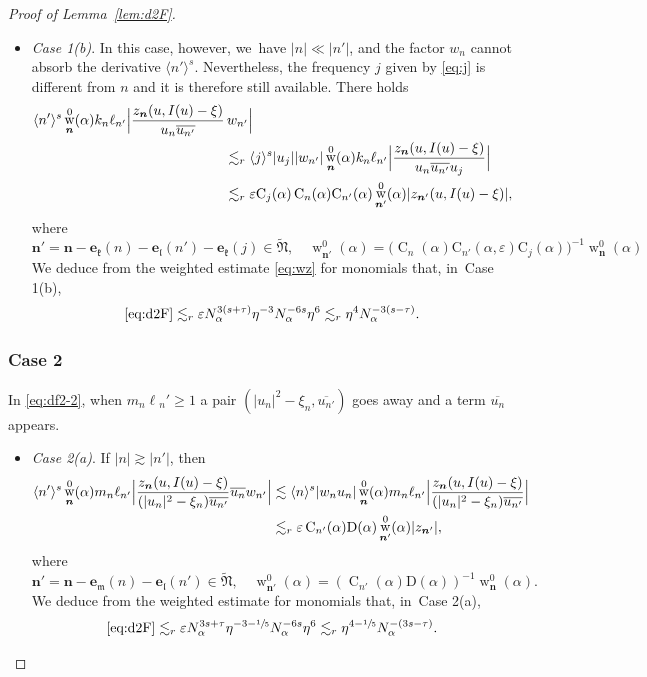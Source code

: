 \documentclass[JEP,XML,SOM,Unicode,published]{cedram}
\DeclareMathOperator{\rw}{w}
\theoremstyle{plain}
\theoremstyle{definition}
\newcommand{\nb}{{\boldsymbol n}}
\newcommand{\Nb}{{\boldsymbol{\mathfrak{N}}}}
\newcommand{\1}{\mathbf{1}}
\let\epsilon\varepsilon
\begin{document}
\begin{proof}[Proof of Lemma~\ref{lem:d2F}]
\begin{itemize}
\item
\textit{Case 1(b)}. In this case, however, we~have
$
|n|\ll |n'|
$,
and the factor $w_{n}$ cannot absorb the derivative $\langle n'\rangle^{s}$. Nevertheless, the frequency $j$ given by \eqref{eq:j} is different from $n$ and it is therefore still available. There holds
\begin{align*}
\langle n'\rangle^{s} \rw_{\nb}^{0}(\alpha)
k_{n}\ell_{n'}
\Bigl|
\frac{z_{\nb}(u,I(u)-\xi)}
{u_{n}\overline{u_{n'}}}&\,w_{n'}
\Bigr|\\
&\lesssim_{r} \langle j\rangle^{s}|u_{j}| |w_{n'}|
\rw_{\nb}^{0}(\alpha)
k_{n}\ell_{n'}
\Bigl|
\frac{z_{\nb}(u,I(u)-\xi)}
{u_{n}\overline{u_{n'}}u_{j}}
\Bigr|\\
&\lesssim_{r}\epsilon\mathrm{C}_j(\alpha)\operatorname{C}_{n}(\alpha)\mathrm{C}_{n'}(\alpha)\rw_{\nb'}^{0}(\alpha)|z_{\nb'}(u,I(u)-\xi)|,
\end{align*}
where
\[
\nb' = \nb - \boldsymbol{e}_{\mathfrak{k}}(n)-\boldsymbol{e}_{\mathfrak{l}}(n')-\boldsymbol{e}_{\mathfrak{k}}(j) \in \widetilde{\Nb},\quad \rw_{\nb'}^{0}(\alpha) = \big(\operatorname{C}_{n}(\alpha)\mathrm{C}_{n'}(\alpha,\epsilon)\mathrm{C}_{j}(\alpha)\big)^{-1}\rw_{\nb}^{0}(\alpha)
\]
We deduce from the weighted estimate \eqref{eq:wz} for monomials that, in~Case 1(b),
\[
\eqref{eq:d2F}\lesssim_{ r}
\epsilon N_{\alpha}^{3(s+\tau)}\eta^{-3}N_{\alpha}^{-6s}\eta^{6}
\lesssim_{r} \eta^{4}N_{\alpha}^{-3(s-\tau)}.
\]
\end{itemize}

\subsubsection*{Case 2} In \eqref{eq:df2-2}, when $m_{n}\ell{_n'}\geq1$ a pair $(|u_{n}|^{2}-\xi_{n},\overline{u_{n'}})$ goes away and a term $\overline{u_{n}}$ appears.

\begin{itemize}
\item
\textit{Case 2(a)}. If
$
|n|\gtrsim |n'|
$,
then
\begin{align*}
\langle n'\rangle^{s}
\rw_{\nb}^{0}(\alpha)
m_{n}\ell_{n'}
\Bigl|
\frac{z_{\nb}(u,I(u)-\xi)}
{(|u_{n}|^{2}-\xi_{n})\overline{u_{n'}}}\overline{u_{n}}w_{n'}
\Bigr|
&
\lesssim
\langle n\rangle^{s}
|w_{n}u_{n}|
\rw_{\nb}^{0}(\alpha)
m_{n}\ell_{n'}
\Bigl|
\frac{z_{\nb}(u,I(u)-\xi)}
{(|u_{n}|^{2}-\xi_{n})\overline{u_{n'}}}
\Bigr| \\
&\lesssim_{r}
\epsilon
\operatorname{C}_{n'}(\alpha)\mathrm{D}(\alpha)
\rw_{\nb'}^{0}(\alpha)|z_{\nb'}|,
\end{align*}
where
\[
\nb'
= \nb-\boldsymbol{e}_{\mathfrak{m}}(n) -\boldsymbol{e}_{\mathfrak{l}}(n')\in\widetilde{\Nb},
\quad
\rw_{\nb'}^{0}(\alpha) = (\operatorname{C}_{n'}(\alpha)\mathrm{D}(\alpha))^{-1}\rw_{\nb}^{0}(\alpha).
\]
We deduce from the weighted estimate for monomials that, in~Case 2(a),
\[
\eqref{eq:d2F}
\lesssim_{r}
\epsilon N_{\alpha}^{3s+\tau}\eta^{-3-\sfrac{1}{5}}N_{\alpha}^{-6s}\eta^{6}
\lesssim_{r}\eta^{4-\sfrac{1}{5}}N_{\alpha}^{-(3s-\tau)}.
\]


\end{itemize}
\end{proof}
\end{document}
